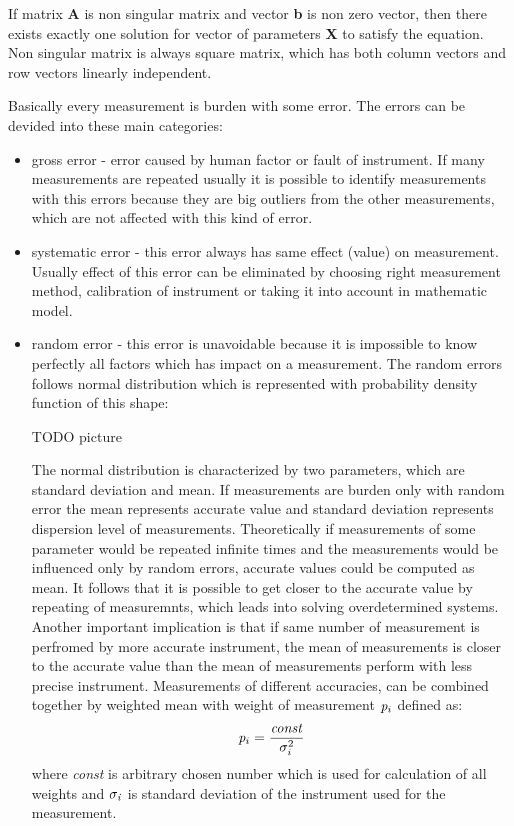\documentclass[a4paper,12pt]{article}
\newcommand{\ematr}[1]{
{\bf #1}
}
\newcommand{\evect}[1]{
{\bf #1}
}
\newcommand{\escal}[1]{
{\it #1}
}
\begin{document}
If matrix \ematr{A} is 
non singular matrix  and vector \evect{b} is non zero vector, then there exists exactly one solution 
for vector of parameters  \evect{X} to satisfy the equation. Non singular matrix is always square matrix, 
which has both column vectors and row vectors linearly independent. 

Basically every measurement is burden with some error. The errors can be devided into these main categories:  
\begin{itemize}
\item gross error - error caused by human factor or fault of instrument. If many measurements are repeated
usually it is possible to identify measurements with this errors because they are big outliers from the other measurements, which are not affected with this 
kind of error.
\item systematic error - this error always has same effect (value) on measurement.  Usually effect of this error can be 
eliminated by choosing right measurement method, calibration of instrument or taking it into account in  mathematic model.
\item random error - this error is unavoidable because it is impossible to know perfectly all factors which has impact 
on a measurement. The random errors follows normal distribution which is represented with probability density function of this shape:

TODO picture


The normal distribution is characterized by two parameters, which are standard deviation and  mean. 
If measurements are burden only with random error the mean represents accurate value and standard deviation represents 
dispersion level of measurements. 
Theoretically  if measurements of some parameter would be repeated infinite times and the measurements would be influenced only by random errors,
accurate values could be computed as mean.
It follows that it is possible to get closer to the accurate value by repeating of measuremnts, which 
leads into solving overdetermined systems. Another important implication is that if same number of measurement is perfromed by more accurate 
instrument, the mean of measurements is closer to the accurate value than the mean of measurements perform with less precise instrument.
Measurements of different accuracies, can be combined together by weighted mean
with weight of measurement $\escal{p}_{i}$ defined as:
\begin{equation}
\label{eq:wmean}
\escal{p}_{i} = \frac{\escal{const}}{\escal{\sigma}_{i}^{2}}
\end{equation} 
where \escal{const} is arbitrary chosen number which is used for calculation of all weights 
and $\escal{\sigma_{i}}$ is standard deviation of the instrument used for the measurement.
\end{itemize}
\end{document}
